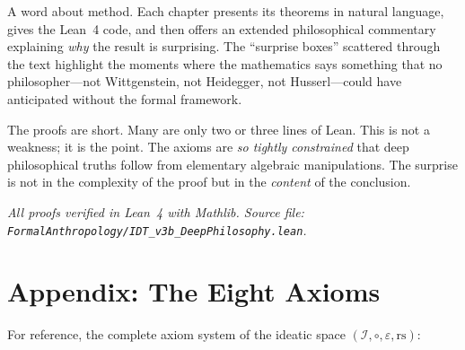 \documentclass[11pt,oneside]{book}
\theoremstyle{plain}
\theoremstyle{definition}
\theoremstyle{remark}
\newcommand{\rs}{\mathrm{rs}}
\newcommand{\compose}{\circ}
\newcommand{\void}{\varepsilon}
\newcommand{\IS}{\mathcal{I}}
\begin{document}
\medskip

\noindent A word about method.  Each chapter presents its theorems in natural language,
gives the Lean~4 code, and then offers an extended philosophical commentary explaining
\emph{why} the result is surprising.  The ``surprise boxes'' scattered through the text
highlight the moments where the mathematics says something that no philosopher---not
Wittgenstein, not Heidegger, not Husserl---could have anticipated without the formal
framework.

The proofs are short.  Many are only two or three lines of Lean.  This is not a weakness;
it is the point.  The axioms are \emph{so tightly constrained} that deep philosophical
truths follow from elementary algebraic manipulations.  The surprise is not in the
complexity of the proof but in the \emph{content} of the conclusion.

\vfill

\noindent\textit{All proofs verified in Lean~4 with Mathlib. Source file:
\texttt{FormalAnthropology/IDT\_v3b\_DeepPhilosophy.lean}.}

\tableofcontents

\mainmatter





\backmatter

\chapter*{Appendix: The Eight Axioms}

For reference, the complete axiom system of the ideatic space
$(\IS, \compose, \void, \rs)$:
\end{document}

